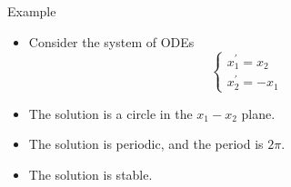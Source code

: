 \documentclass{beamer}
\begin{document}
\begin{frame}{Example}
    \begin{itemize}
        \item Consider the system of ODEs
        \[
        \left\{\begin{array}{l}
            x_1^{\prime}=x_2 \\
            x_2^{\prime}=-x_1
            \end{array}\right.
            \]
        \item The solution is a circle in the $x_1-x_2$ plane.
        \item The solution is periodic, and the period is $2\pi$.
        \item The solution is stable.
    
    \end{itemize}

\end{frame}
\end{document}
